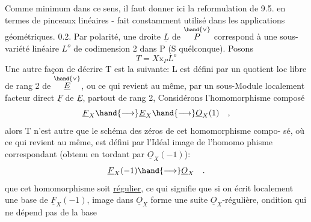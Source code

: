 
Comme minimum dans ce sens, il faut  donner ici la reformulation de 9.5.
en termes de pinceaux linéaires  -  fait constamment utilisé dans les
applications géométriques.
0.2.  Par polarité, une droite $\underline{L}$  de $\overset{\hand{\vee}}{P}$  correspond à une sous-variété
linéaire $L^{o}$ de codimension 2 dans P  (S quélconque).  Posons
\[ T = X\mathrm{x}_{P}L^{o} \]
Une autre façon  de décrire T est la suivante:  L  est défini par un
quotient loc libre de rang 2 de $\overset{\hand{\vee}}{\underline{E}}$, ou ce qui revient au même, par un
sous-Module localement facteur direct  $\underline{F}$ de $\underline{E}$, partout de rang 2,
Considérons  l'homomorphisme composé
\[ \underline{F}_{X} \hand{\longrightarrow} \underline{E}_{X} \hand{\longrightarrow} \underline{O}_{X}(1) \quad , \]
alors  T n'est autre que  le schéma des zéros de cet homomorphisme compo-%
sé, où ce qui revient au même, est défini par l'Idéal  image de l'homomo%
phisme correspondant (obtenu en tordant par $\underline{O}_{X}(-1)$):
\[ \underline{F}_{X}(-1) \hand{\longrightarrow} \underline{O}_{X} \quad . \]
 que cet homomorphisme soit \uline{régulier}, ce qui signifie
que  si on écrit localement une base  de $\underline{F}_{X}(-1)$,   image dans $\underline{O}_{X}$\hand{\unsure{$\curvearrowleft$|$\widehat{\ }$}}
forme une suite $\underline{O}_{X}$-régulière, ondition qui ne dépend pas de la base
